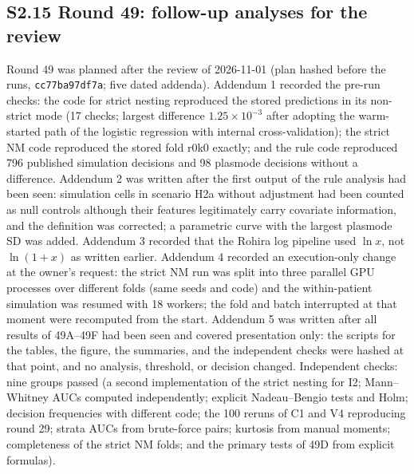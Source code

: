 \subsection*{S2.15 Round 49: follow-up analyses for the review}
Round 49 was planned after the review of 2026-11-01 (plan hashed before the runs, \texttt{cc77ba97df7a}; five dated addenda). Addendum 1 recorded the pre-run checks: the code for strict nesting reproduced the stored predictions in its non-strict mode (17 checks; largest difference $1.25\times10^{-3}$ after adopting the warm-started path of the logistic regression with internal cross-validation); the strict NM code reproduced the stored fold r0k0 exactly; and the rule code reproduced 796 published simulation decisions and 98 plasmode decisions without a difference. Addendum 2 was written after the first output of the rule analysis had been seen: simulation cells in scenario H2a without adjustment had been counted as null controls although their features legitimately carry covariate information, and the definition was corrected; a parametric curve with the largest plasmode SD was added. Addendum 3 recorded that the Rohira log pipeline used $\ln x$, not $\ln(1+x)$ as written earlier. Addendum 4 recorded an execution-only change at the owner's request: the strict NM run was split into three parallel GPU processes over different folds (same seeds and code) and the within-patient simulation was resumed with 18 workers; the fold and batch interrupted at that moment were recomputed from the start. Addendum 5 was written after all results of 49A--49F had been seen and covered presentation only: the scripts for the tables, the figure, the summaries, and the independent checks were hashed at that point, and no analysis, threshold, or decision changed. Independent checks: nine groups passed (a second implementation of the strict nesting for I2; Mann--Whitney AUCs computed independently; explicit Nadeau--Bengio tests and Holm; decision frequencies with different code; the 100 reruns of C1 and V4 reproducing round 29; strata AUCs from brute-force pairs; kurtosis from manual moments; completeness of the strict NM folds; and the primary tests of 49D from explicit formulas).

